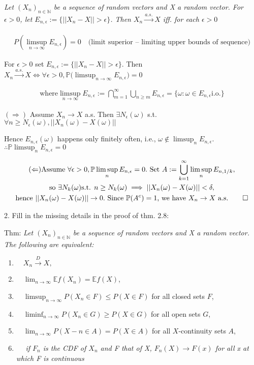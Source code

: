 \documentclass[10pt]{article}
\begin{document}
\textit{Let $(X_n)_{n \in \mathbb{N}}$ be a sequence of random vectors and X a random vector. For $\epsilon > 0$, let $E_{n, \epsilon}:=\{||X_n - X|| > \epsilon\}$. Then $X_n \xrightarrow[]{a.s.} X$ iff. for each $\epsilon > 0$}

\begin{gather*}
    P(\limsup_{n \to \infty}E_{n, \epsilon}) = 0 \quad\text{(limit superior – limiting upper bounds of sequence)}
\end{gather*}

For $\epsilon > 0$ set $E_{n, \epsilon}:=\{||X_n - X|| > \epsilon\}$. Then $X_n \xrightarrow{a.s.} X \iff \forall\epsilon > 0, \mathbb{P}\Big(\limsup_{n \to \infty}E_{n, \epsilon}\Big) = 0$

\begin{gather*}
    \text{where} \limsup_{n \to \infty}E_{n, \epsilon}:= \bigcap_{m = 1}^\infty \bigcup_{n \geq m}E_{n, \epsilon} = \{\omega: \omega \in E_{n, \epsilon} \text{i.o.}\}
\end{gather*}

$(\Rightarrow)$ Assume $X_n \to X$ a.s. Then $\exists N_\epsilon(\omega)$ s.t. $\forall n \geq N_\epsilon(\omega), ||X_n(\omega) - X(\omega)||$

Hence $E_{n, \epsilon}(\omega)$ happens only finitely often, i.e., $\omega \notin \limsup_n E_{n, \epsilon}$. $\therefore \mathbb{P}\limsup_{n} E_{n, \epsilon} = 0$

\begin{gather*}
    (\Leftarrow) \text{Assume }\forall\epsilon > 0, \mathbb{P}\limsup_n E_{n, \epsilon} = 0. \text{ Set } A := \bigcup_{k = 1}^\infty \limsup_n E_{n, 1/k}, \\
    \text{so }\exists N_k(\omega) \text{s.t. } n \geq N_k(\omega) \implies ||X_n(\omega) - X(\omega)|| < \delta, \\
    \text{hence }||X_n(\omega) - X(\omega)|| \to 0. \text{ Since } \mathbb{P}(A^c) = 1 \text{, we have }X_n \to X \text{ a.s.} \qed
\end{gather*}

\newpage

2. Fill in the missing details in the proof of thm. 2.8:

Thm: \textit{Let $(X_n)_{n \in \mathbb{N}}$ be a sequence of random vectors and X a random vector. The following are equivalent: }

\begin{enumerate}[label=(\roman*)]
    \item $\quad X_n \xrightarrow{D} X,$
    \item $\quad \lim_{n \to \infty} \mathbb{E}f(X_n) = \mathbb{E}f(X)$,
    \item $\quad \limsup_{n \to \infty}P(X_n \in F) \leq P(X \in F)$ for all closed sets $F$,
    \item $\quad \liminf_{n \to \infty} P(X_n \in G) \geq P(X \in G)$ for all open sets $G$,
    \item $\quad \lim_{n \to \infty} P(X-n \in A) = P(X \in A)$ for all $X$-continuity sets $A$,
    \item $\quad$ \textit{if $F_n$ is the CDF of $X_n$ and F that of X, $F_n(X) \to F(x)$ for all x at which F is continuous}
\end{enumerate}
\end{document}
